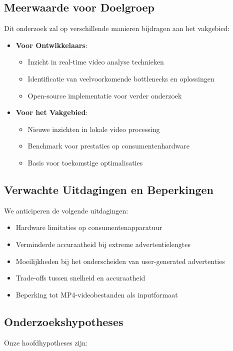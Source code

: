 \subsection{Meerwaarde voor Doelgroep}
Dit onderzoek zal op verschillende manieren bijdragen aan het vakgebied:

\begin{itemize}
    \item \textbf{Voor Ontwikkelaars}:
    \begin{itemize}
        \item Inzicht in real-time video analyse technieken
        \item Identificatie van veelvoorkomende bottlenecks en oplossingen
        \item Open-source implementatie voor verder onderzoek
    \end{itemize}
    
    \item \textbf{Voor het Vakgebied}:
    \begin{itemize}
        \item Nieuwe inzichten in lokale video processing
        \item Benchmark voor prestaties op consumentenhardware
        \item Basis voor toekomstige optimalisaties
    \end{itemize}
\end{itemize}

\subsection{Verwachte Uitdagingen en Beperkingen}
We anticiperen de volgende uitdagingen:

\begin{itemize}
    \item Hardware limitaties op consumentenapparatuur
    \item Verminderde accuraatheid bij extreme advertentielengtes
    \item Moeilijkheden bij het onderscheiden van user-generated advertenties
    \item Trade-offs tussen snelheid en accuraatheid
    \item Beperking tot MP4-videobestanden als inputformaat
\end{itemize}

\subsection{Onderzoekshypotheses}
Onze hoofdhypotheses zijn:


